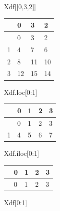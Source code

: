 \documentclass[
  a4paper,
  DIV=11,
  numbers=noendperiod]{scrreprt}
\newenvironment{Shaded}{\begin{snugshade}}{\end{snugshade}}
\newcommand{\DecValTok}[1]{\textcolor[rgb]{0.68,0.00,0.00}{#1}}
\newcommand{\NormalTok}[1]{\textcolor[rgb]{0.00,0.23,0.31}{#1}}
\begin{document}
\begin{Shaded}
\begin{Highlighting}[]
\NormalTok{Xdf[[}\DecValTok{0}\NormalTok{,}\DecValTok{3}\NormalTok{,}\DecValTok{2}\NormalTok{]]}
\end{Highlighting}
\end{Shaded}

\begin{longtable}[]{@{}llll@{}}
\toprule\noalign{}
& 0 & 3 & 2 \\
\midrule\noalign{}
\endhead
\bottomrule\noalign{}
\endlastfoot
0 & 0 & 3 & 2 \\
1 & 4 & 7 & 6 \\
2 & 8 & 11 & 10 \\
3 & 12 & 15 & 14 \\
\end{longtable}

\begin{Shaded}
\begin{Highlighting}[]
\NormalTok{Xdf.loc[}\DecValTok{0}\NormalTok{:}\DecValTok{1}\NormalTok{]}
\end{Highlighting}
\end{Shaded}

\begin{longtable}[]{@{}lllll@{}}
\toprule\noalign{}
& 0 & 1 & 2 & 3 \\
\midrule\noalign{}
\endhead
\bottomrule\noalign{}
\endlastfoot
0 & 0 & 1 & 2 & 3 \\
1 & 4 & 5 & 6 & 7 \\
\end{longtable}

\begin{Shaded}
\begin{Highlighting}[]
\NormalTok{Xdf.iloc[}\DecValTok{0}\NormalTok{:}\DecValTok{1}\NormalTok{]}
\end{Highlighting}
\end{Shaded}

\begin{longtable}[]{@{}lllll@{}}
\toprule\noalign{}
& 0 & 1 & 2 & 3 \\
\midrule\noalign{}
\endhead
\bottomrule\noalign{}
\endlastfoot
0 & 0 & 1 & 2 & 3 \\
\end{longtable}

\begin{Shaded}
\begin{Highlighting}[]
\NormalTok{Xdf[}\DecValTok{0}\NormalTok{:}\DecValTok{1}\NormalTok{]}
\end{Highlighting}
\end{Shaded}
\end{document}
